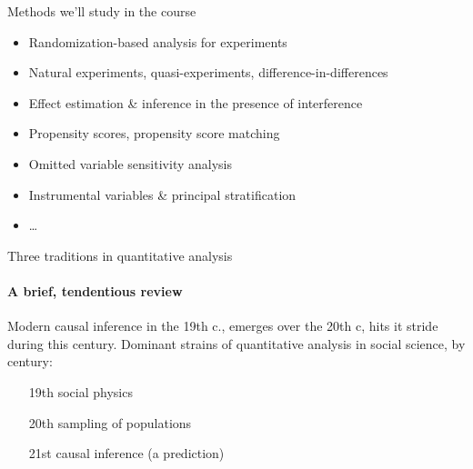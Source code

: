 




\begin{frame}[label=whatWeWillCoverFr]{Methods we'll study in the course}
  \begin{itemize}
  \item Randomization-based analysis for experiments
  \item Natural experiments, quasi-experiments,
    difference-in-differences
  \item Effect estimation \& inference in the presence of interference
  \item Propensity scores, propensity score matching
  \item Omitted variable sensitivity analysis
  \item Instrumental variables \& principal stratification
  \item \ldots
  \end{itemize}
\end{frame}


\begin{frame}{Three traditions in quantitative analysis}
\framesubtitle{A brief, tendentious review}

Modern causal inference in the 19th c., emerges over the 20th c, hits
it stride during this century. Dominant strains of quantitative
analysis in social science, by century:

\begin{itemize}
\item[19th] social physics
\item[20th] sampling of populations
\item[21st] causal inference (a prediction)
\end{itemize}

  
\end{frame}

